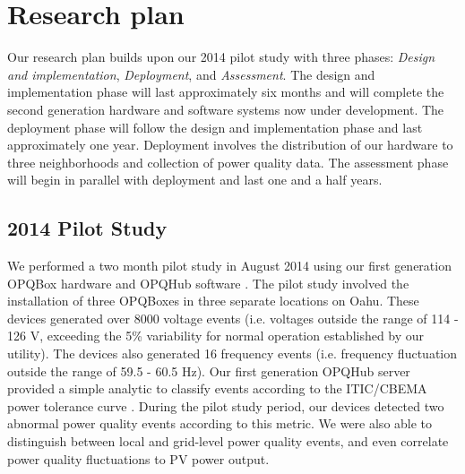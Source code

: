 
\section{Research plan}


Our research plan builds upon our 2014 pilot study with three phases: {\em Design and implementation}, {\em Deployment}, and {\em Assessment}.  The design and implementation phase will last approximately six months and will complete the second generation hardware and software systems now under development. The deployment phase will follow the design and implementation phase and last approximately one year. Deployment involves the distribution of our hardware to three neighborhoods and collection of power quality data.  The assessment phase will begin in parallel with deployment and last one and a half years. 

\subsection{2014 Pilot Study}

We performed a two month pilot study in August 2014 using our first generation OPQBox hardware and OPQHub software \cite{g1-pilot-study}. The pilot study involved the installation of three OPQBoxes in three separate locations on Oahu. These devices generated over 8000 voltage events (i.e. voltages outside the range of 114 - 126 V, exceeding the 5\% variability for normal operation established by our utility).  The devices also generated 16 frequency events (i.e. frequency fluctuation outside the range of 59.5 - 60.5 Hz). Our first generation OPQHub server provided a simple analytic to classify events according to the ITIC/CBEMA power tolerance curve \cite{ITIC}. During the pilot study period, our devices detected two abnormal power quality events according to this metric. We were also able to distinguish between local and grid-level power quality events, and even correlate power quality fluctuations to PV power output.

